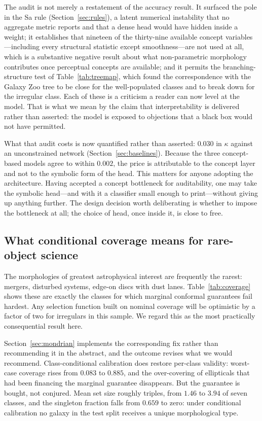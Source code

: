 \documentclass[11pt]{article}
\begin{document}
The audit is not merely a restatement of the accuracy result. It surfaced the
pole in the Sa rule (Section~\ref{sec:rules}), a latent numerical instability
that no aggregate metric reports and that a dense head would have hidden
inside a weight; it establishes that nineteen of the thirty-nine available
concept variables---including every structural statistic except
smoothness---are not used at all, which is a substantive negative result about
what non-parametric morphology contributes once perceptual concepts are
available; and it permits the branching-structure test of
Table~\ref{tab:treemap}, which found the correspondence with the Galaxy Zoo
tree to be close for the well-populated classes and to break down for the
irregular class. Each of these is a criticism a reader can now level at the
model. That is what we mean by the claim that interpretability is delivered
rather than asserted: the model is exposed to objections that a black box
would not have permitted.

What that audit costs is now quantified rather than asserted: $0.030$ in
$\kappa$ against an unconstrained network (Section~\ref{sec:baselines}).
Because the three concept-based models agree to within $0.002$, the price is
attributable to the concept layer and not to the symbolic form of the head.
This matters for anyone adopting the architecture. Having accepted a concept
bottleneck for auditability, one may take the symbolic head---and with it a
classifier small enough to print---without giving up anything further. The
design decision worth deliberating is whether to impose the bottleneck at all;
the choice of head, once inside it, is close to free.

\subsection{What conditional coverage means for rare-object science}

The morphologies of greatest astrophysical interest are frequently the rarest:
mergers, disturbed systems, edge-on discs with dust lanes. Table~\ref{tab:coverage}
shows these are exactly the classes for which marginal conformal guarantees
fail hardest. Any selection function built on nominal coverage will be
optimistic by a factor of two for irregulars in this sample. We regard this as
the most practically consequential result here.

Section~\ref{sec:mondrian} implements the corresponding fix rather than
recommending it in the abstract, and the outcome revises what we would
recommend. Class-conditional calibration does restore per-class validity:
worst-case coverage rises from $0.083$ to $0.885$, and the over-covering of
ellipticals that had been financing the marginal guarantee disappears. But the
guarantee is bought, not conjured. Mean set size roughly triples, from $1.46$
to $3.94$ of seven classes, and the singleton fraction falls from $0.659$ to
zero: under conditional calibration no galaxy in the test split receives a
unique morphological type.
\end{document}
